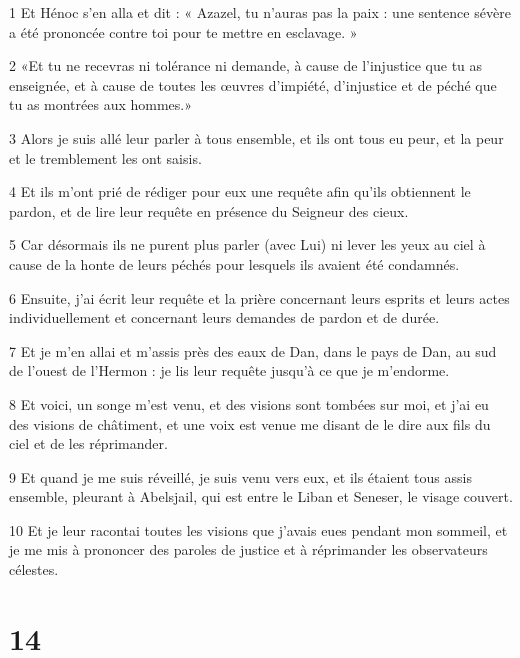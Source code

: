 \par 1 Et Hénoc s'en alla et dit : « Azazel, tu n'auras pas la paix : une sentence sévère a été prononcée contre toi pour te mettre en esclavage. »
\par 2 «Et tu ne recevras ni tolérance ni demande, à cause de l'injustice que tu as enseignée, et à cause de toutes les œuvres d'impiété, d'injustice et de péché que tu as montrées aux hommes.»
\par 3 Alors je suis allé leur parler à tous ensemble, et ils ont tous eu peur, et la peur et le tremblement les ont saisis.
\par 4 Et ils m'ont prié de rédiger pour eux une requête afin qu'ils obtiennent le pardon, et de lire leur requête en présence du Seigneur des cieux.
\par 5 Car désormais ils ne purent plus parler (avec Lui) ni lever les yeux au ciel à cause de la honte de leurs péchés pour lesquels ils avaient été condamnés.
\par 6 Ensuite, j'ai écrit leur requête et la prière concernant leurs esprits et leurs actes individuellement et concernant leurs demandes de pardon et de durée.
\par 7 Et je m'en allai et m'assis près des eaux de Dan, dans le pays de Dan, au sud de l'ouest de l'Hermon : je lis leur requête jusqu'à ce que je m'endorme.
\par 8 Et voici, un songe m'est venu, et des visions sont tombées sur moi, et j'ai eu des visions de châtiment, et une voix est venue me disant de le dire aux fils du ciel et de les réprimander.
\par 9 Et quand je me suis réveillé, je suis venu vers eux, et ils étaient tous assis ensemble, pleurant à Abelsjail, qui est entre le Liban et Seneser, le visage couvert.
\par 10 Et je leur racontai toutes les visions que j'avais eues pendant mon sommeil, et je me mis à prononcer des paroles de justice et à réprimander les observateurs célestes.

\chapter{14}

